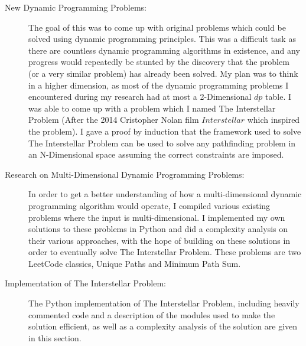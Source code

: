 \begin{description}
    \item[New Dynamic Programming Problems:]
    The goal of this was to come up with original problems which could be solved using dynamic programming principles.
    This was a difficult task as there are countless dynamic programming algorithms in existence,
    and any progress would repeatedly be stunted by the discovery that the problem (or a very similar problem) has already been solved.
    My plan was to think in a higher dimension, as most of the dynamic programming problems I encountered during my research had at most a 2-Dimensional $dp$ table.
    I was able to come up with a problem which I named The Interstellar Problem (After the 2014 Cristopher Nolan film $Interstellar$ which inspired the problem).
    I gave a proof by induction that the framework used to solve The Interstellar Problem can be used to solve any pathfinding problem in an N-Dimensional space assuming the correct constraints are imposed.
    
    \item[Research on Multi-Dimensional Dynamic Programming Problems:]
    In order to get a better understanding of how a multi-dimensional dynamic programming algorithm would operate,
    I compiled various existing problems where the input is multi-dimensional.
    I implemented my own solutions to these problems in Python and did a complexity analysis on their various approaches, with the hope of building on these solutions in order to eventually solve The Interstellar Problem.
    These problems are two LeetCode classics, Unique Paths and Minimum Path Sum.
    
    \item[Implementation of The Interstellar Problem:]
    The Python implementation of The Interstellar Problem, including heavily commented code and a description of the modules used to make the solution efficient, as well as a complexity analysis of the solution are given in this section.
\end{description}


